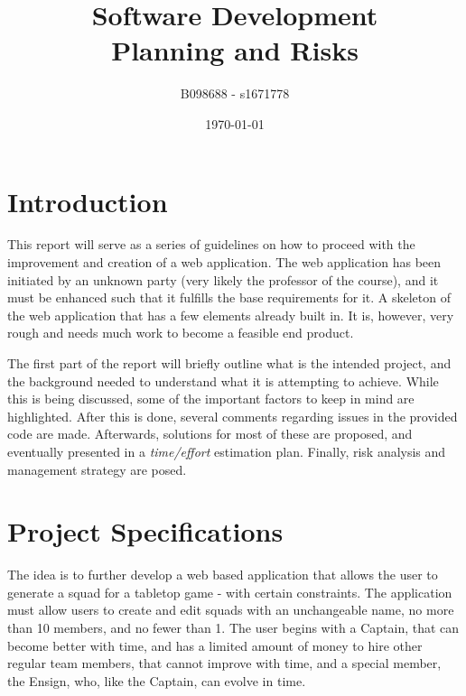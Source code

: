 \documentclass[12pt,a4paper]{article}
\begin{document}
\title{Software Development\\Planning and Risks}
\author{B098688 - s1671778}
\date{\today}

\makeEPCCtitle

\thispagestyle{empty}

\newpage


\tableofcontents


\newpage
{}

\section{Introduction}

This report will serve as a series of guidelines on how to proceed with the improvement and creation of a web application. The web application has been initiated by an unknown party (very likely the professor of the course), and it must be enhanced such that it fulfills the base requirements for it. A skeleton of the web application that has a few elements already built in. It is, however, very rough and needs much work to become a feasible end product. 

The first part of the report will briefly outline what is the intended project, and the background needed to understand what it is attempting to achieve. While this is being discussed, some of the important factors to keep in mind are highlighted. After this is done, several comments regarding issues in the provided code are made. Afterwards, solutions for most of these are proposed, and eventually presented in a \textit{time/effort} estimation plan. Finally, risk analysis and management strategy are posed.

\section{Project Specifications}

The idea is to further develop a web based application that allows the user to generate a squad for a tabletop game - with certain constraints. The application must allow users to create and edit squads with an unchangeable name, no more than 10 members, and no fewer than 1. The user begins with a Captain, that can become better with time, and has a limited amount of money to hire other regular team members, that cannot improve with time, and a special member, the Ensign, who, like the Captain, can evolve in time.
\end{document}
